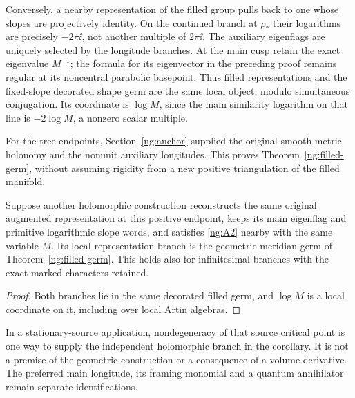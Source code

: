 Conversely, a nearby representation of the filled group pulls
back to one whose slopes are projectively identity.
On the continued branch at $\rho_*$ their logarithms are precisely
$-2\pi\ii$, not another multiple of $2\pi\ii$.
The auxiliary eigenflags are uniquely selected by the longitude
branches. At the main cusp retain the exact eigenvalue $M^{-1}$;
the formula for its eigenvector in the preceding proof remains
regular at its noncentral parabolic basepoint.
Thus filled representations and the fixed-slope decorated shape
germ are the same local object, modulo simultaneous conjugation.
Its coordinate is $\log M$, since the main similarity logarithm
on that line is $-2\log M$, a nonzero scalar multiple.

For the tree endpoints, Section~\ref{ng:anchor} supplied the
original smooth metric holonomy and the nonunit auxiliary
longitudes. This proves Theorem~\ref{ng:filled-germ}, without
assuming rigidity from a new positive triangulation of the filled
manifold.

\begin{corollary}
\label{ng:branch-identification}
Suppose another holomorphic construction reconstructs the same
original augmented representation at this positive endpoint,
keeps its main eigenflag and primitive logarithmic slope words,
and satisfies \eqref{ng:A2} nearby with the same variable $M$.
Its local representation branch is the geometric meridian germ
of Theorem~\ref{ng:filled-germ}. This holds also for infinitesimal
branches with the exact marked characters retained.
\end{corollary}
\begin{proof}
Both branches lie in the same decorated filled germ, and $\log M$
is a local coordinate on it, including over local Artin algebras.
\end{proof}

In a stationary-source application, nondegeneracy of that source
critical point is one way to supply the independent holomorphic
branch in the corollary. It is not a premise of the geometric
construction or a consequence of a volume derivative. The
preferred main longitude, its framing monomial and a quantum
annihilator remain separate identifications.
